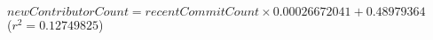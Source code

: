 $\mathit{newContributorCount} = \mathit{recentCommitCount} \times 0.00026672041 + 0.48979364$\\($r^2 = 0.12749825$)